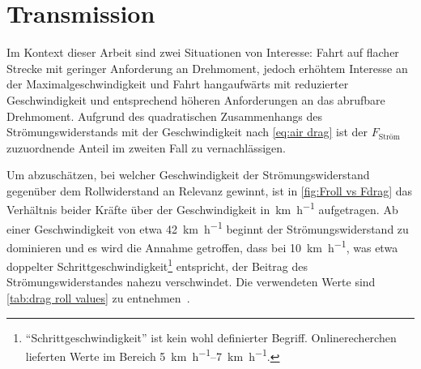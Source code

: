 	\section{Transmission}\label{sec:transmission}
		Im Kontext dieser Arbeit sind zwei Situationen von Interesse: Fahrt auf flacher Strecke mit geringer Anforderung an Drehmoment, jedoch erhöhtem Interesse an der Maximalgeschwindigkeit und Fahrt hangaufwärts mit reduzierter Geschwindigkeit und entsprechend höheren Anforderungen an das abrufbare Drehmoment.
		Aufgrund des quadratischen Zusammenhangs des Strömungswiderstands mit der Geschwindigkeit nach \cref{eq:air drag} ist der \(F_\text{Ström}\) zuzuordnende Anteil im zweiten Fall zu vernachlässigen.

		Um abzuschätzen, bei welcher Geschwindigkeit der Strömungswiderstand gegenüber dem Rollwiderstand an Relevanz gewinnt, ist in \cref{fig:Froll vs Fdrag} das Verhältnis beider Kräfte über der Geschwindigkeit in~\unit{\kilo\metre\per\hour} aufgetragen.
		Ab einer Geschwindigkeit von etwa \qty{42}{\kilo\metre\per\hour} beginnt der Strömungswiderstand zu dominieren und es wird die Annahme getroffen, dass bei \qty{10}{\kilo\metre\per\hour}, was etwa doppelter Schrittgeschwindigkeit\footnote{\hspace{1mm} ``Schrittgeschwindigkeit'' ist kein wohl definierter Begriff. Onlinerecherchen lieferten Werte im Bereich \qtyrange{5}{7}{\kilo\metre\per\hour}.} entspricht, der Beitrag des Strömungswiderstandes nahezu verschwindet.
		Die verwendeten Werte sind \cref{tab:drag roll values} zu entnehmen~\cites{GESTIS.Luft}{air.drag.human.body.VANINGENSCHENAU1982}{material.advances.skateboarding.WATERMAN1978}.

